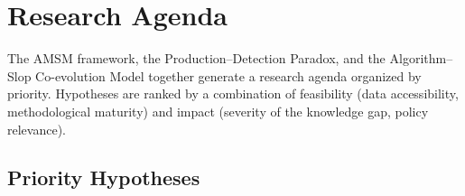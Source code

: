 \documentclass[12pt,a4paper]{article}
\begin{document}
\section{Research Agenda}
\label{sec:agenda}

The AMSM framework, the Production--Detection Paradox, and the Algorithm--Slop Co-evolution Model together generate a research agenda organized by priority. Hypotheses are ranked by a combination of feasibility (data accessibility, methodological maturity) and impact (severity of the knowledge gap, policy relevance).

\subsection{Priority Hypotheses}
\end{document}
